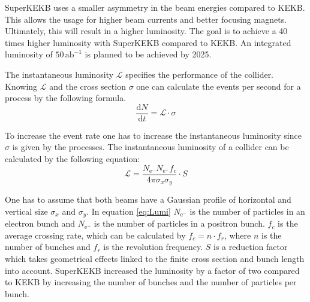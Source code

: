 \documentclass[a4paper,11pt,twosided,final,german,openbib,pdftex,listof=totoc,bibliography=totoc]{scrbook}
\begin{document}
SuperKEKB uses a smaller asymmetry in the beam energies compared to KEKB. This allows the usage for higher beam currents and better focusing magnets. Ultimately, this will result in a higher luminosity. The goal is to achieve a 40 times higher luminosity with SuperKEKB compared to KEKB.
An integrated luminosity of $50\,\textrm{ab}^{-1}$ is planned to be achieved by 2025.\cite{B2B}

The instantaneous luminosity $\mathcal{L}$ specifies the performance of the collider. Knowing $\mathcal{L} $ and the cross section $\sigma$ one can calculate the events per second for a process by the following formula.
\begin{equation}
\frac{\textrm{d}N}{\textrm{d}t} = \mathcal{L} \cdot \sigma
\end{equation} 

To increase the event rate one has to increase the instantaneous luminosity since $\sigma$ is given by the processes. The instantaneous luminosity of a collider can be calculated by the following equation:
\begin{equation}
	\mathcal{L} = \frac{N_{\textrm{e}^-}N_{\textrm{e}^+}f_c}{4\pi \sigma_x \sigma_y} \cdot S
	\label{eq:Lumi}
\end{equation}

One has to assume that both beams have a Gaussian profile of horizontal and vertical size $\sigma_x$ and $\sigma_y$. In equation \ref{eq:Lumi} $N_{\textrm{e}^-}$ is the number of particles in an electron bunch and $N_{\textrm{e}^+}$ is the number of particles in a positron bunch. $f_c$ is the average crossing rate, which can be calculated by $f_c = n \cdot f_r$, where $n$ is the number of bunches and $f_r$ is the revolution frequency. $S$ is a reduction factor which takes geometrical effects linked to the finite cross section and bunch length into account.\cite{herr2006concept} 
SuperKEKB increased the luminosity by a factor of two compared to KEKB by increasing the number of bunches and the number of particles per bunch.
 
\end{document}
